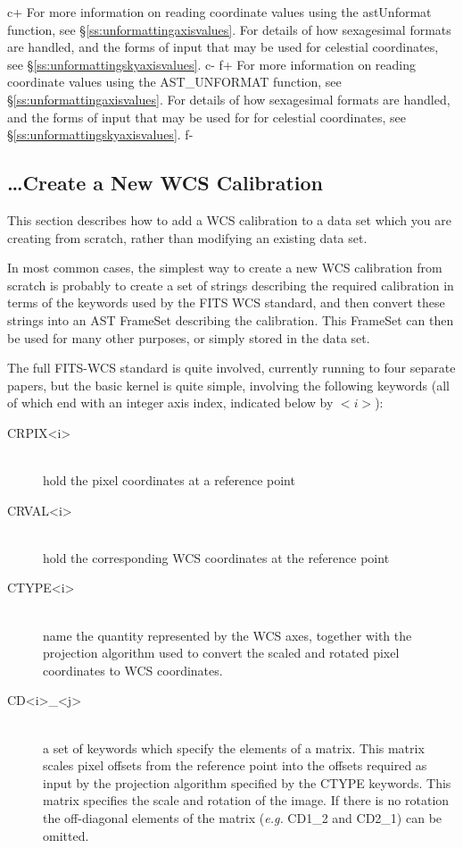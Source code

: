 \documentclass[twoside,11pt]{starlink}
\providecommand{\secref}[1]{\S\ref{#1}}
\begin{document}
c+
For more information on reading coordinate values using the
astUnformat function, see \secref{ss:unformattingaxisvalues}. For
details of how sexagesimal formats are handled, and the forms of input
that may be used for celestial coordinates, see
\secref{ss:unformattingskyaxisvalues}.
c-
f+
For more information on reading coordinate values using the
AST\_UNFORMAT function, see \secref{ss:unformattingaxisvalues}. For
details of how sexagesimal formats are handled, and the forms of input
that may be used for for celestial coordinates, see
\secref{ss:unformattingskyaxisvalues}.
f-

\subsection{\label{ss:howtocreatenewwcs}\ldots Create a New WCS Calibration}

This section describes how to add a WCS calibration to a data set which you
are creating from scratch, rather than modifying an existing data set.

In most common cases, the simplest way to create a new WCS calibration
from scratch is probably to create a set of strings describing the
required calibration in terms of the keywords used by the FITS WCS
standard, and then convert these strings into an AST FrameSet describing
the calibration. This FrameSet can then be used for many other purposes, or
simply stored in the data set.

The full FITS-WCS standard is quite involved, currently running to four
separate papers, but the basic kernel is quite simple, involving the
following keywords (all of which end with an integer axis index,
indicated below by $<i>$):

\begin{description}
\item[CRPIX<i>]\mbox{}\\
hold the pixel coordinates at a reference point
\item[CRVAL<i>]\mbox{}\\
hold the corresponding WCS coordinates at the reference point
\item[CTYPE<i>]\mbox{}\\
name the quantity represented by the WCS axes, together with the
projection algorithm used to convert the scaled and rotated pixel coordinates
to WCS coordinates.
\item[CD<i>\_<j>]\mbox{}\\
a set of keywords which specify the elements of a matrix. This matrix scales
pixel offsets from the reference point into the offsets required as input
by the projection algorithm specified by the CTYPE keywords. This matrix
specifies the scale and rotation of the image. If there is no rotation
the off-diagonal elements of the matrix (\emph{e.g.} CD1\_2 and
CD2\_1) can be omitted.
\end{description}
\end{document}
